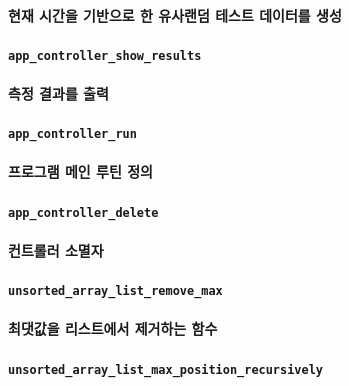\documentclass[UTF8, a4paper]{report}
\begin{document}
            \paragraph{%
                \normalfont 현재 시간을 기반으로 한 유사랜덤 테스트 데이터를 생성
            }
            
            \paragraph{\texttt{app\_controller\_show\_results}}
            \paragraph{%
                \normalfont 측정 결과를 출력
            }
            
            \paragraph{\texttt{app\_controller\_run}}
            \paragraph{%
                \normalfont 프로그램 메인 루틴 정의
            }
            
            \paragraph{\texttt{app\_controller\_delete}}
            \paragraph{%
                \normalfont 컨트롤러 소멸자
            }
            
            \paragraph{\texttt{unsorted\_array\_list\_remove\_max}}
            \paragraph{%
                \normalfont 최댓값을 리스트에서 제거하는 함수 
            }

            \paragraph{\texttt{unsorted\_array\_list\_max\_position\_recursively}}
\end{document}
